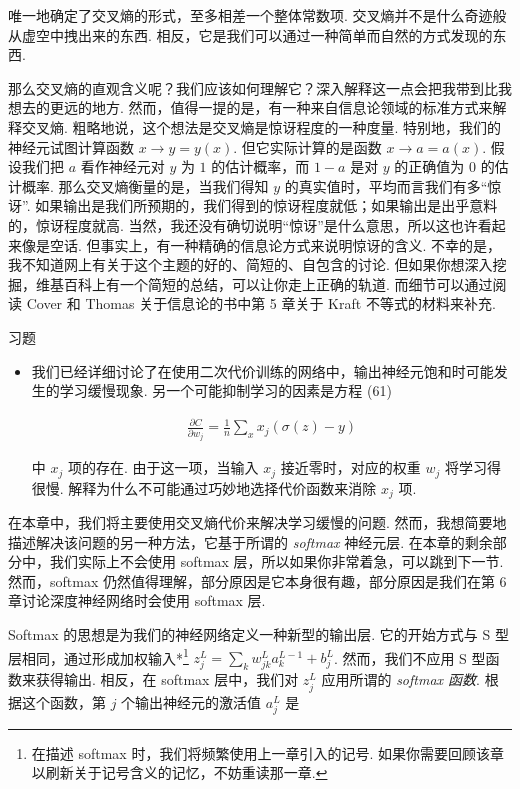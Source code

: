\noindent 唯一地确定了交叉熵的形式，至多相差一个整体常数项. 交叉熵并不是什么奇迹般从虚空中拽出来的东西. 相反，它是我们可以通过一种简单而自然的方式发现的东西.

那么交叉熵的直观含义呢？我们应该如何理解它？深入解释这一点会把我带到比我想去的更远的地方. 然而，值得一提的是，有一种来自信息论领域的标准方式来解释交叉熵. 粗略地说，这个想法是交叉熵是惊讶程度的一种度量. 特别地，我们的神经元试图计算函数 $x \rightarrow y = y(x)$. 但它实际计算的是函数 $x \rightarrow a = a(x)$. 假设我们把 $a$ 看作神经元对 $y$ 为 $1$ 的估计概率，而 $1-a$ 是对 $y$ 的正确值为 $0$ 的估计概率. 那么交叉熵衡量的是，当我们得知 $y$ 的真实值时，平均而言我们有多``惊讶''. 如果输出是我们所预期的，我们得到的惊讶程度就低；如果输出是出乎意料的，惊讶程度就高. 当然，我还没有确切说明``惊讶''是什么意思，所以这也许看起来像是空话. 但事实上，有一种精确的信息论方式来说明惊讶的含义. 不幸的是，我不知道网上有关于这个主题的好的、简短的、自包含的讨论. 但如果你想深入挖掘，维基百科上有一个简短的总结，可以让你走上正确的轨道. 而细节可以通过阅读 Cover 和 Thomas 关于信息论的书中第 5 章关于 Kraft 不等式的材料来补充.

\begin{exerciseBox}{习题}

\begin{itemize}

\item
我们已经详细讨论了在使用二次代价训练的网络中，输出神经元饱和时可能发生的学习缓慢现象. 另一个可能抑制学习的因素是方程 (61)

\begin{align*}
\frac{\partial C}{\partial w_j} = \frac{1}{n} \sum_x x_j(\sigma(z)-y) \nonumber
\end{align*}

中 $x_j$ 项的存在. 由于这一项，当输入 $x_j$ 接近零时，对应的权重 $w_j$ 将学习得很慢. 解释为什么不可能通过巧妙地选择代价函数来消除 $x_j$ 项.

\end{itemize}

\end{exerciseBox}

在本章中，我们将主要使用交叉熵代价来解决学习缓慢的问题. 然而，我想简要地描述解决该问题的另一种方法，它基于所谓的 \emph{softmax} 神经元层. 在本章的剩余部分中，我们实际上不会使用 softmax 层，所以如果你非常着急，可以跳到下一节. 然而，softmax 仍然值得理解，部分原因是它本身很有趣，部分原因是我们在第 6 章讨论深度神经网络时会使用 softmax 层.

Softmax 的思想是为我们的神经网络定义一种新型的输出层. 它的开始方式与 S 型层相同，通过形成加权输入*\footnote{在描述 softmax 时，我们将频繁使用上一章引入的记号. 如果你需要回顾该章以刷新关于记号含义的记忆，不妨重读那一章.} $z^L_j = \sum_{k} w^L_{jk} a^{L-1}_k + b^L_j$. 然而，我们不应用 S 型函数来获得输出. 相反，在 softmax 层中，我们对 $z^L_j$ 应用所谓的 \emph{softmax 函数}. 根据这个函数，第 $j$ 个输出神经元的激活值 $a^L_j$ 是

